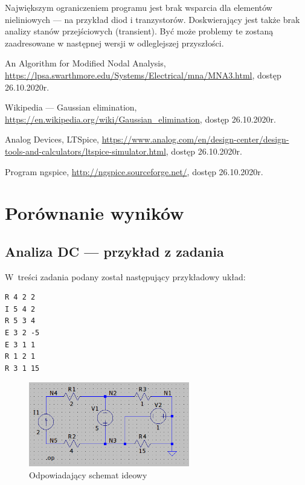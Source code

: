 \documentclass[11pt, final]{article}
\renewenvironment{thebibliography}[1]{
  \begin{oldthebibliography}{#1}
    \setlength{\itemsep}{0.4em}
    \setlength{\parskip}{0em}
}
{
  \end{oldthebibliography}
}
\begin{document}
Największym ograniczeniem programu jest brak wsparcia dla elementów nieliniowych --- na przykład diod i tranzystorów.  Doskwierający jest także brak analizy stanów przejściowych (transient). Być może problemy te
zostaną zaadresowane w następnej wersji w odleglejszej przyszłości.

\begin{thebibliography}{9}
	\small

	 An Algorithm for Modified Nodal Analysis, \url{https://lpsa.swarthmore.edu/Systems/Electrical/mna/MNA3.html}, dostęp 26.10.2020r.
	
	 Wikipedia --- Gaussian elimination, \url{https://en.wikipedia.org/wiki/Gaussian_elimination}, dostęp 26.10.2020r.
	
	 Analog Devices, LTSpice, \url{https://www.analog.com/en/design-center/design-tools-and-calculators/ltspice-simulator.html}, dostęp 26.10.2020r.
	
	 Program ngspice, \url{http://ngspice.sourceforge.net/}, dostęp 26.10.2020r.
\end{thebibliography}



\newpage
\appendix
\section{Porównanie wyników}

\subsection{Analiza DC --- przykład z zadania}
\noindent W treści zadania podany został następujący przykładowy układ:

\begin{multicols}{2}
\begin{lstlisting}[caption=Netlista opisująca układ]
R 4 2 2
I 5 4 2
R 5 3 4
E 3 2 -5
E 3 1 1
R 1 2 1
R 3 1 15
\end{lstlisting}

\columnbreak

\begin{figure}[H]
\centering
\includegraphics[width = 7cm]{example}
\caption{Odpowiadający schemat ideowy}
\end{figure}
\end{multicols}
\end{document}
